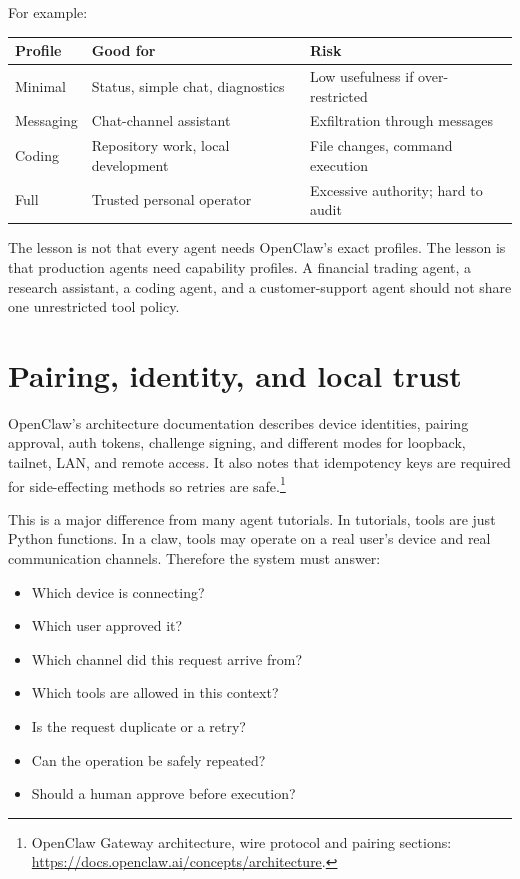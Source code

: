 For example:

\begin{longtable}{p{}p{}p{}}
\toprule
\textbf{Profile} & \textbf{Good for} & \textbf{Risk} \\
\midrule
Minimal & Status, simple chat, diagnostics & Low usefulness if over-restricted \\
Messaging & Chat-channel assistant & Exfiltration through messages \\
Coding & Repository work, local development & File changes, command execution \\
Full & Trusted personal operator & Excessive authority; hard to audit \\
\bottomrule
\end{longtable}

The lesson is not that every agent needs OpenClaw's exact profiles. The lesson is that production agents need capability profiles. A financial trading agent, a research assistant, a coding agent, and a customer-support agent should not share one unrestricted tool policy.

\section{Pairing, identity, and local trust}

OpenClaw's architecture documentation describes device identities, pairing approval, auth tokens, challenge signing, and different modes for loopback, tailnet, LAN, and remote access. It also notes that idempotency keys are required for side-effecting methods so retries are safe.\footnote{OpenClaw Gateway architecture, wire protocol and pairing sections: \url{https://docs.openclaw.ai/concepts/architecture}.}

This is a major difference from many agent tutorials. In tutorials, tools are just Python functions. In a claw, tools may operate on a real user's device and real communication channels. Therefore the system must answer:

\begin{itemize}[leftmargin=*]
  \item Which device is connecting?
  \item Which user approved it?
  \item Which channel did this request arrive from?
  \item Which tools are allowed in this context?
  \item Is the request duplicate or a retry?
  \item Can the operation be safely repeated?
  \item Should a human approve before execution?
\end{itemize}

